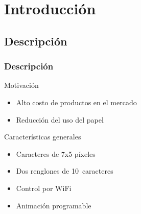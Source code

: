 \section{Introducción} 

\subsection{Descripción}
 

\newcommand\cantLetrasRenglon{10}

\begin{frame}
	\frametitle{Descripción}
	
		\begin{block}{Motivación}
			\begin{itemize}
				\item Alto costo de productos en el mercado
				\item Reducción del uso del papel
			\end{itemize}
		\end{block}

		\begin{block}{Características generales}
			\begin{itemize}
				\item Caracteres de 7x5 píxeles
				\item Dos renglones de \cantLetrasRenglon\ caracteres
				\item Control por WiFi
				\item Animación programable
			\end{itemize}
		\end{block}

\end{frame}

